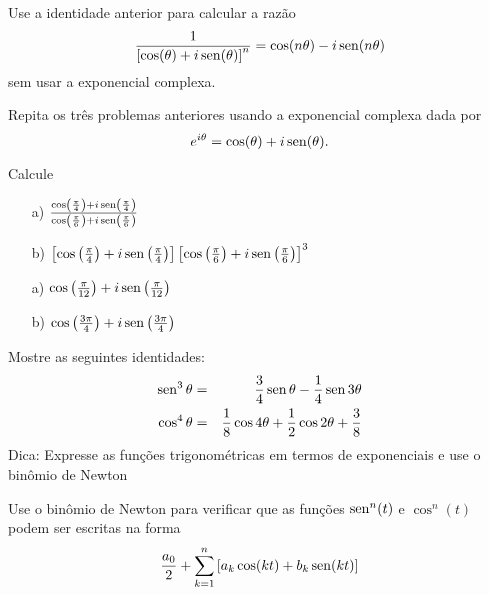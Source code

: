 \begin{Exercise}Use a identidade anterior para calcular a razão
$$\frac{1}{\left[\cos(\theta)+i\operatorname{sen}(\theta)\right]^n}=\cos(n\theta)-i\operatorname{sen}(n\theta)$$
sem usar a exponencial complexa.
\end{Exercise}

\begin{Exercise}Repita os três problemas anteriores usando a exponencial complexa dada por
$$e^{i\theta}=\cos(\theta)+i\operatorname{sen}(\theta).$$
\end{Exercise}


\begin{Exercise} Calcule
\begin{itemize}
\item[a)] $\frac{\cos\left(\frac{\pi}{4}\right)+i\operatorname{sen}\left(\frac{\pi}{4}\right)}{\cos\left(\frac{\pi}{6}\right)+i\operatorname{sen}\left(\frac{\pi}{6}\right)}$
\item[b)] $\left[\cos\left(\frac{\pi}{4}\right)+i\operatorname{sen}\left(\frac{\pi}{4}\right)\right]\left[\cos\left(\frac{\pi}{6}\right)+i\operatorname{sen}\left(\frac{\pi}{6}\right)\right]^3$
\end{itemize}
\end{Exercise}

\begin{Answer} 
\begin{itemize}
\item[a)] $\cos\left(\frac{\pi}{12}\right)+i\operatorname{sen}\left(\frac{\pi}{12}\right)$
\item[b)] $\cos\left(\frac{3\pi}{4}\right)+i\operatorname{sen}\left(\frac{3\pi}{4}\right)$
\end{itemize}
\end{Answer}



\begin{Exercise}Mostre as seguintes identidades:
\begin{eqnarray*}
\operatorname{sen}^3\theta&=&\frac{3}{4}\operatorname{sen}\theta-\frac{1}{4}\operatorname{sen} 3\theta\\
\cos^4\theta&=&\frac{1}{8}\cos 4\theta+\frac{1}{2}\cos 2\theta+\frac{3}{8}
\end{eqnarray*}
Dica: Expresse as funções trigonométricas em termos de exponenciais e use o  binômio de Newton 
\end{Exercise}

\begin{Exercise}Use o binômio de Newton para verificar que as funções $\operatorname{sen}^n(t)$ e $\cos^n(t)$ podem ser escritas na forma 
$$\frac{a_0}{2}+\sum_{k=1}^n \left[a_k\cos(kt)+b_k\operatorname{sen}(kt)\right]$$
\end{Exercise}

